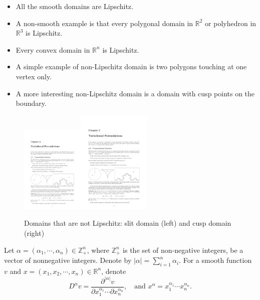 \begin{example}
\begin{itemize}
\item All the smooth domains are Lipschitz.
\item A non-smooth example is that every polygonal domain in $\mathbb R^2$ or polyhedron in $\mathbb R^3$ is Lipschitz.
\item Every convex domain in $\mathbb R^n$ is Lipschitz.
\item A simple example of non-Lipschitz domain is two polygons touching at one vertex only.
\item A more interesting non-Lipschitz domain is a domain with cusp points on the boundary.
\end{itemize}
\end{example}
\begin{figure}[htbp]
  \centering
  \includegraphics[width=3cm]{figures/slitdomain}\quad\includegraphics[width=3.5cm]{figures/cuspdomain}\\
  \caption{Domains that are not Lipschitz: slit domain (left) and cusp domain (right)}\label{nonLipschitzDmain}
\end{figure}


Let $\alpha=(\alpha_1, \cdots, \alpha_n)\in\mathbb Z_+^n$, where $\mathbb Z_+^n$ is the set of non-negative integers, be a vector
of nonnegative integers. Denote by $|\alpha|=\sum_{i=1}^n\alpha_i$. For a smooth function $v$ and $x =(x_1,  x_2, \cdots, x_n)\in\mathbb R^n$, denote
\[
D^{\alpha}v=\frac{\partial^{|\alpha|}v}{\partial x_1^{\alpha_1}\cdots\partial x_n^{\alpha_n}},\quad \textrm{and } x^{\alpha}=x_1^{\alpha_1}\cdots x_n^{\alpha_n}.
\]

